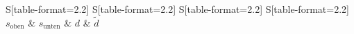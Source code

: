 \begin{table}
    \centering
    \caption{Berechnete Abstände der Löcher zum oberen Rand $s_\text{oben}$ und zum unteren Rand $s_\text{unten}$, die daraus bestimmte Dicke der Löcher $d$ und die gemessene Dicke der Löcher. Alle Werte in \si{\milli\meter}.}
    \label{tab:ObenGanz}
    \begin{tabular}{
	S[table-format=2.2]
	S[table-format=2.2]
	S[table-format=2.2]
	S[table-format=2.2]
	}
	\toprule
	{$s_\text{oben}$}		& {$s_\text{unten}$}		& 
	{$d$}		& {$\tilde{d}$}		\\ 
	\midrule
    
    \bottomrule
    \end{tabular}
    \end{table}
